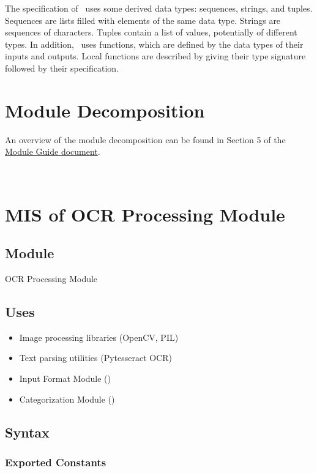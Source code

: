 \documentclass[12pt, titlepage]{article}
\begin{document}
\noindent
The specification of \progname \ uses some derived data types: sequences, strings, and
tuples. Sequences are lists filled with elements of the same data type. Strings
are sequences of characters. Tuples contain a list of values, potentially of
different types. In addition, \progname \ uses functions, which
are defined by the data types of their inputs and outputs. Local functions are
described by giving their type signature followed by their specification.

\section{Module Decomposition}

An overview of the module decomposition can be found in Section 5 of the
\href{https://github.com/PlutosCapstone/Plutos/blob/main/docs/Design/SoftArchitecture/MG.pdf}{Module
Guide document}.


~\newpage

\section{MIS of OCR Processing Module}\label{OCR_Processing_Module}

\subsection{Module}

OCR Processing Module

\subsection{Uses}

\begin{itemize}
  \item Image processing libraries (OpenCV, PIL)
  \item Text parsing utilities (Pytesseract OCR)
  \item Input Format Module ()
  \item Categorization Module ()
\end{itemize}

\subsection{Syntax}

\subsubsection{Exported Constants}
\end{document}
